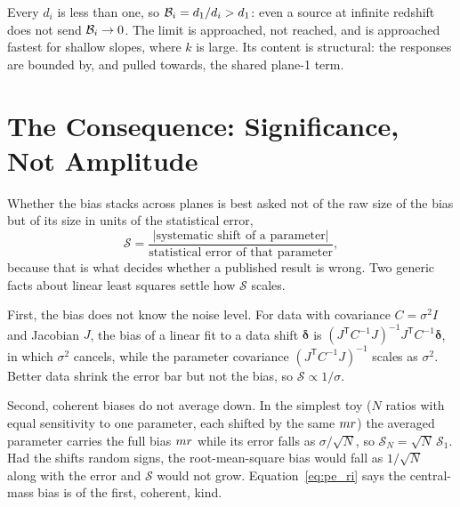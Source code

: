 \begin{annotation}
Every $d_i$ is less than one, so $\mathcal{B}_i=d_1/d_i>d_1$: even a source at
infinite redshift does not send $\mathcal{B}_i\to0$. The limit is
approached, not reached, and is approached fastest for shallow slopes,
where $k$ is large. Its content is structural: the responses are bounded
by, and pulled towards, the shared plane-1 term.
\end{annotation}

\section{The Consequence: Significance, Not Amplitude}
\label{sec:pe_significance}

Whether the bias stacks across planes is best asked not of the raw size
of the bias but of its size in units of the statistical error,
\begin{equation}
    \mathcal{S}=\frac{|\text{systematic shift of a parameter}|}{\text{statistical error of that parameter}} ,
    \label{eq:pe_S}
\end{equation}
because that is what decides whether a published result is wrong. Two
generic facts about linear least squares settle how $\mathcal{S}$
scales.

First, the bias does not know the noise level. For data with
covariance $C=\sigma^2I$ and Jacobian $J$, the bias of a linear fit to a
data shift $\boldsymbol\delta$ is
$(J^{\mathsf T}C^{-1}J)^{-1}J^{\mathsf T}C^{-1}\boldsymbol\delta$, in
which $\sigma^2$ cancels, while the parameter covariance
$(J^{\mathsf T}C^{-1}J)^{-1}$ scales as $\sigma^2$. Better data shrink
the error bar but not the bias, so $\mathcal{S}\propto1/\sigma$.

Second, coherent biases do not average down. In the simplest toy
($N$ ratios with equal sensitivity to one parameter, each shifted by the
same $m r$) the averaged parameter carries the full bias $m r$
while its error falls as $\sigma/\sqrt N$, so
$\mathcal{S}_N=\sqrt N\,\mathcal{S}_1$. Had the shifts random signs, the
root-mean-square bias would fall as $1/\sqrt N$ along with the error and
$\mathcal{S}$ would not grow. Equation~\eqref{eq:pe_ri} says the
central-mass bias is of the first, coherent, kind.

